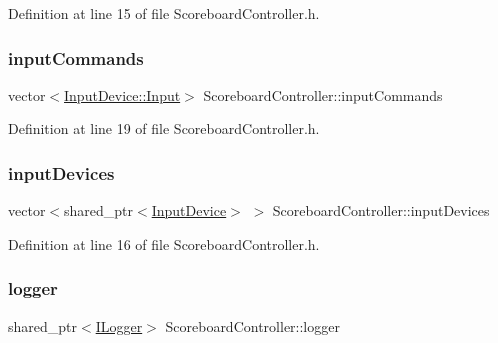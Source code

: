 Definition at line 15 of file Scoreboard\+Controller.\+h.

\mbox{\label{class_scoreboard_controller_a77a8287bcad5b5101b6be16f1314bc84}} 
\subsubsection{\texorpdfstring{input\+Commands}{inputCommands}}
{\footnotesize\ttfamily vector$<$\hyperlink{class_input_device_a75152d8f06b6d032036014e42e44688b}{Input\+Device\+::\+Input}$>$ Scoreboard\+Controller\+::input\+Commands\hspace{0.3cm}{\ttfamily [private]}}



Definition at line 19 of file Scoreboard\+Controller.\+h.

\mbox{\label{class_scoreboard_controller_a52fc99700dbe759cf0ffadf92219c229}} 
\subsubsection{\texorpdfstring{input\+Devices}{inputDevices}}
{\footnotesize\ttfamily vector$<$shared\+\_\+ptr$<$\hyperlink{class_input_device}{Input\+Device}$>$ $>$ Scoreboard\+Controller\+::input\+Devices\hspace{0.3cm}{\ttfamily [private]}}



Definition at line 16 of file Scoreboard\+Controller.\+h.

\mbox{\label{class_scoreboard_controller_a4ebbb799945c5968d44c91266735a1d4}} 
\subsubsection{\texorpdfstring{logger}{logger}}
{\footnotesize\ttfamily shared\+\_\+ptr$<$\hyperlink{class_i_logger}{I\+Logger}$>$ Scoreboard\+Controller\+::logger\hspace{0.3cm}{\ttfamily [private]}}



